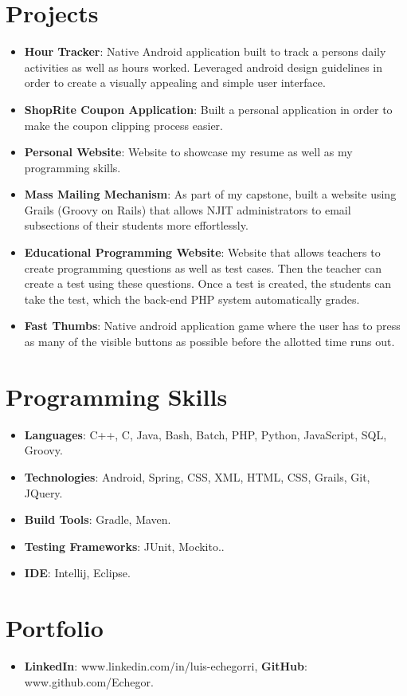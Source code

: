 \documentclass[letterpaper,11pt]{article}
\newcommand{\resumeItem}[2]{
  \item\small{
    \textbf{#1}{: #2 \vspace{-2pt}}
  }
}
\newcommand{\resumeSubItem}[2]{\resumeItem{#1}{#2}\vspace{-4pt}}
\newcommand{\resumeSubHeadingListStart}{\begin{itemize}[leftmargin=*]}
\newcommand{\resumeSubHeadingListEnd}{\end{itemize}}
\begin{document}
\section{Projects}
  \resumeSubHeadingListStart
    \resumeSubItem{Hour Tracker}
      {Native Android application built to track a persons daily activities as well as hours worked. Leveraged android design guidelines in order to create a visually appealing and simple user interface.}
    \resumeSubItem{ShopRite Coupon Application}
      {Built a personal application in order to make the coupon clipping process easier.}
    \resumeSubItem{Personal Website}
      {Website to showcase my resume as well as my programming skills.}
    \resumeSubItem{Mass Mailing Mechanism}
      {As part of my capstone, built a website using Grails (Groovy on Rails) that allows NJIT administrators to email subsections of their students more effortlessly.}
    \resumeSubItem{Educational Programming Website}
      {Website that allows teachers to create programming questions as well as test cases. Then the teacher can create a test using these questions. Once a test is created, the students can take the test, which the back-end PHP system automatically grades.} 
    \resumeSubItem{Fast Thumbs}
      {Native android application game where the user has to press as many of the visible buttons as possible before the allotted time runs out.}  
  \resumeSubHeadingListEnd
  
\section{Programming Skills}
  \resumeSubHeadingListStart
    \resumeSubItem{Languages}
      {C++, C, Java, Bash, Batch, PHP, Python, JavaScript, SQL, Groovy.}
    \resumeSubItem{Technologies}
      {Android, Spring, CSS, XML, HTML, CSS, Grails, Git, JQuery.}
    \resumeSubItem{Build Tools}
      {Gradle, Maven.}
    \resumeSubItem{Testing Frameworks}
      {JUnit, Mockito..}
    \resumeSubItem{IDE}
      {Intellij, Eclipse.}      
  \resumeSubHeadingListEnd
  
\section{Portfolio}
  \resumeSubHeadingListStart
    \item{
     \textbf{LinkedIn}{: www.linkedin.com/in/luis-echegorri,}
     \hfill
     \textbf{GitHub}{: www.github.com/Echegor.}
    }
  \resumeSubHeadingListEnd
\end{document}
